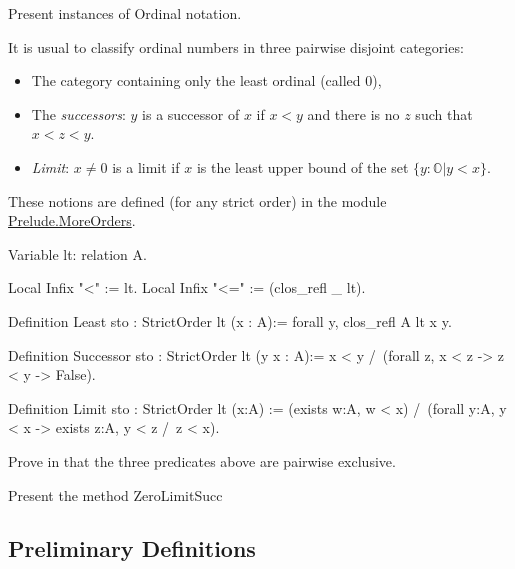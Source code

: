 
\begin{todo}
Present instances of Ordinal notation.  
\end{todo}




It is usual to classify ordinal numbers in three pairwise disjoint categories: 
\begin{itemize}
\item The category containing only the least ordinal (called $0$),
\item The \emph{successors}: $y$ is a successor of $x$ if $x<y$ and there is no $z$ such that $x<z<y$. 
\item \emph{Limit}: $x\not=0$ is a limit if $x$ is the least upper bound of the set $\{y :\mathbb{O} | y < x\}$.
\end{itemize}


These notions are defined (for any strict order) in the module 
\href{../src/html/hydras.Prelude.MoreOrders.html}{Prelude.MoreOrders}.
 


\begin{Coqsrc}
Variable lt: relation A.
  
 Local Infix "<" := lt.
 Local Infix "<=" := (clos_refl _ lt).

 Definition Least  {sto : StrictOrder lt} (x : A):= forall y,  clos_refl A lt x y.

Definition Successor {sto : StrictOrder lt} (y x : A):=
  x < y /\ (forall z,  x < z ->  z <  y -> False).

Definition Limit {sto : StrictOrder lt}  (x:A)  :=
  (exists w:A,  w < x) /\
  (forall y:A, y < x -> exists z:A, y < z /\  z < x).
\end{Coqsrc}


\begin{exercise}
Prove in \coq{} that the three predicates above are pairwise exclusive.  
\end{exercise}



\begin{todo}
Present the method ZeroLimitSucc 
\end{todo}


\subsection{Preliminary Definitions}

